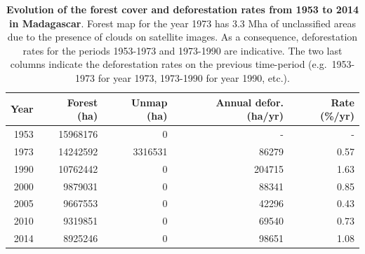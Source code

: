 \documentclass[a4paper, 12pt, leqno]{article} %
\begin{document}
\vfill
\begin{table}[!h]
  \begin{longtable}[]{@{}rrrrr@{}}
    \toprule
    Year & Forest (ha) & Unmap (ha) & Annual defor. (ha/yr) & Rate
    (\%/yr)\tabularnewline
    \midrule
    \endhead
    1953 & 15968176 & 0 & - & -\tabularnewline
    1973 & 14242592 & 3316531 & 86279 & 0.57\tabularnewline
    1990 & 10762442 & 0 & 204715 & 1.63\tabularnewline
    2000 & 9879031 & 0 & 88341 & 0.85\tabularnewline
    2005 & 9667553 & 0 & 42296 & 0.43\tabularnewline
    2010 & 9319851 & 0 & 69540 & 0.73\tabularnewline
    2014 & 8925246 & 0 & 98651 & 1.08\tabularnewline
    \bottomrule
  \end{longtable}
  \addtocounter{table}{-1}

  \caption{\textbf{Evolution of the forest cover and deforestation rates
      from 1953 to 2014 in Madagascar}. Forest map for the year 1973 has 3.3
    Mha of unclassified areas due to the presence of clouds on satellite
    images. As a consequence, deforestation rates for the periods 1953-1973
    and 1973-1990 are indicative. The two last columns indicate the
    deforestation rates on the previous time-period (e.g.~1953-1973 for year
    1973, 1973-1990 for year 1990, etc.).}

  \label{tab:forest_cover}
\end{table}
\vfill

\newpage
\end{document}
